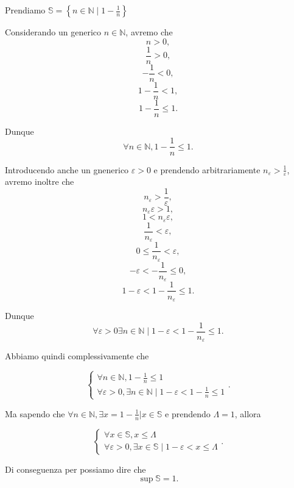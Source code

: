\begin{example}\leavevmode

    Prendiamo $\mathbb{S} = \left\{ n\in\mathbb{N} \mid 1 - \frac{1}{n} \right\}$

    Considerando un generico $n\in\mathbb{N}$, avremo che
    \[ n > 0, \]
    \[ \frac{1}{n}>0, \]
    \[ -\frac{1}{n} < 0, \]
    \[ 1-\frac{1}{n} < 1, \]
    \[ 1-\frac{1}{n} \leq 1. \]

    Dunque
    \[ \forall n\in\mathbb{N}, 1-\frac{1}{n} \leq 1. \]

    Introducendo anche un gnenerico
    $\varepsilon > 0$ e prendendo arbitrariamente $n_\varepsilon > \frac{1}{\varepsilon}$,
    avremo inoltre che
    \[ n_\varepsilon > \frac{1}{\varepsilon}, \]
    \[ n_\varepsilon \varepsilon > 1, \]
    \[ 1 < n_\varepsilon \varepsilon, \]
    \[ \frac{1}{n_\varepsilon} < \varepsilon, \]
    \[ 0 \leq \frac{1}{n_\varepsilon} < \varepsilon, \]
    \[-\varepsilon < -\frac{1}{n_\varepsilon} \leq 0,\]
    \[1-\varepsilon < 1-\frac{1}{n_\varepsilon} \leq 1.\]

    Dunque
    \[\forall \varepsilon>0 \exists n\in\mathbb{N} \mid 1-\varepsilon < 1-\frac{1}{n_\varepsilon} \leq 1.\]

    Abbiamo quindi complessivamente che

    \[
        \begin{cases}
            \forall n\in\mathbb{N}, 1 - \frac{1}{n} \leq 1 \\
            \forall \varepsilon > 0, \exists n\in\mathbb{N} \mid 1-\varepsilon < 1 - \frac{1}{n} \leq 1
        \end{cases}.
    \]

    Ma sapendo che $\forall n\in\mathbb{N}, \exists x=1-\frac{1}{n} | x\in\mathbb{S}$
    e prendendo $\Lambda = 1$, allora

    \[
        \begin{cases}
            \forall x\in\mathbb{S}, x \leq \Lambda \\
            \forall \varepsilon > 0, \exists x\in\mathbb{S} \mid 1-\varepsilon < x \leq \Lambda
        \end{cases}.
    \]

    Di conseguenza per  possiamo dire che
    \[ \sup\mathbb{S} = 1. \] 
\end{example}